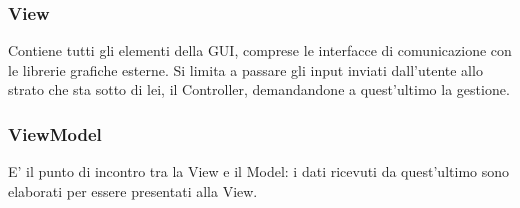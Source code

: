 {{	\subsubsection{View}{	
		Contiene tutti gli elementi della GUI, comprese le interfacce di comunicazione con le librerie grafiche esterne. Si limita a passare gli input inviati dall'utente allo strato che sta sotto di lei, il Controller, demandandone a quest'ultimo la	gestione.
		}
	\subsubsection{ViewModel}{
		E' il punto di incontro tra la View e il Model: i dati ricevuti da quest’ultimo sono elaborati per essere presentati alla View.
		}
	}
}